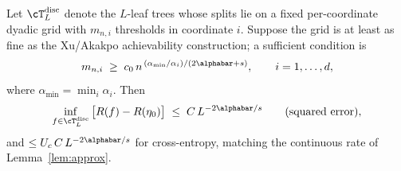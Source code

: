 \begin{lemma}\label{lem:approx-disc}
Let $\cT_L^{\mathrm{disc}}$ denote the $L$-leaf trees whose splits lie on a
fixed per-coordinate dyadic grid with $m_{n,i}$ thresholds in coordinate $i$.
Suppose the grid is at least as fine as the Xu/Akakpo achievability
construction; a sufficient condition is
\begin{equation}\label{eq:grid-rate}
  m_{n,i} \;\ge\; c_0\, n^{\,(\alpha_{\min}/\alpha_i)/(2\alphabar + s)},
  \qquad i = 1, \dots, d,
\end{equation}
where $\alpha_{\min} = \min_i \alpha_i$. Then
\begin{equation}\label{eq:approx-disc}
  \inf_{f \in \cT_L^{\mathrm{disc}}}\, \bigl[ R(f) - R(\eta_0) \bigr]
  \;\le\; C\, L^{-2\alphabar/s}
  \qquad(\text{squared error}),
\end{equation}
and $\le U_c\, C\, L^{-2\alphabar/s}$ for cross-entropy, matching the continuous
rate of Lemma~\ref{lem:approx}.
\end{lemma}

